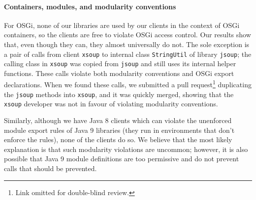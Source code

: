 %








\paragraph{Containers, modules, and modularity conventions}
For OSGi, none of our libraries are used by our clients in the context of OSGi containers, so the clients are free to violate OSGi access control. Our results show that, even though they can, they almost universally do not. The sole exception is a pair of calls from client \texttt{xsoup} to internal class \texttt{StringUtil} of library \texttt{jsoup}; the calling class in \texttt{xsoup} was copied from \texttt{jsoup} and still uses its internal helper functions. These calls violate both modularity conventions and OSGi export declarations. When we found these calls, we submitted a pull request\footnote{Link omitted for double-blind review.} duplicating the \texttt{jsoup} methods into \texttt{xsoup}, and it was quickly merged, showing that the \texttt{xsoup} developer was not in favour of violating modularity conventions.

Similarly, although we have Java 8 clients which can violate the unenforced module export rules of Java 9 libraries (they run in environments that don't enforce the rules), none of the clients do so. We believe that the most likely explanation is that such modularity violations are uncommon; however, it is also possible that Java 9 module definitions are too permissive and do not prevent calls that should be prevented.

